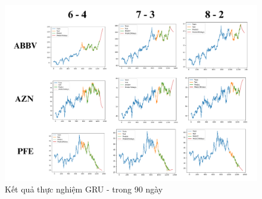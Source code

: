 \documentclass[conference]{IEEEtran}
\begin{document}
\vspace{-20pt}
\begin{figure}[H]
    \centering
    \begin{minipage}{0.5\textwidth}
    \centering
    \includegraphics[width=1\textwidth]{Image/GRU90.png}
    \caption{Kết quả thực nghiệm GRU - trong 90 ngày}
    \label{fig:1}
    \end{minipage}
\end{figure}
\end{document}
